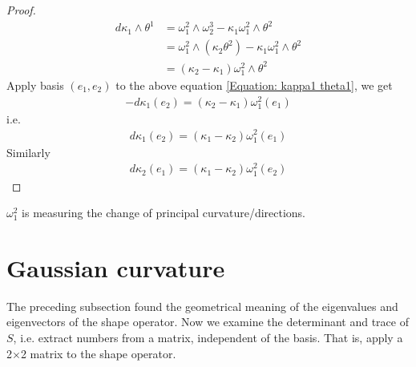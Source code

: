 \documentclass[10pt]{article}
\begin{document}
\begin{proof}
                \begin{equation}\label{Equation: kappa1 theta1}
                    \begin{aligned}
                        d\kappa_1\wedge\theta^1 &= \omega_1^2\wedge\omega_2^3 - \kappa_1 \omega_1^2\wedge\theta^2 \\
                        &= \omega_1^2\wedge(\kappa_2\theta^2) - \kappa_1 \omega_1^2\wedge\theta^2 \\
                        &= (\kappa_2 - \kappa_1)\omega_1^2\wedge\theta^2
                    \end{aligned}
                \end{equation}
                Apply basis $(e_1, e_2)$ to the above equation \eqref{Equation: kappa1 theta1}, we get
                \begin{equation*}
                    \begin{aligned}
                        -d\kappa_1(e_2) = (\kappa_2 - \kappa_1)\omega_1^2(e_1)
                    \end{aligned}
                \end{equation*}
                i.e.
                \begin{equation*}
                    \begin{aligned}
                        d\kappa_1(e_2) = (\kappa_1 - \kappa_2)\omega_1^2(e_1)
                    \end{aligned}
                \end{equation*}
                Similarly
                \begin{equation*}
                    \begin{aligned}
                        d\kappa_2(e_1) = (\kappa_1 - \kappa_2)\omega_1^2(e_2)
                    \end{aligned}
                \end{equation*}
            \end{proof}
            \begin{remark}
                $\omega_1^2$ is measuring the change of principal curvature/directions.
            \end{remark}





        \newpage
        \section{Gaussian curvature}
            The preceding subsection found the geometrical meaning of the eigenvalues and eigenvectors of the shape operator. Now we examine the determinant and trace of $S$, i.e. extract numbers from a matrix, independent of the basis. That is, apply a 2$\times$2 matrix to the shape operator.
\end{document}
